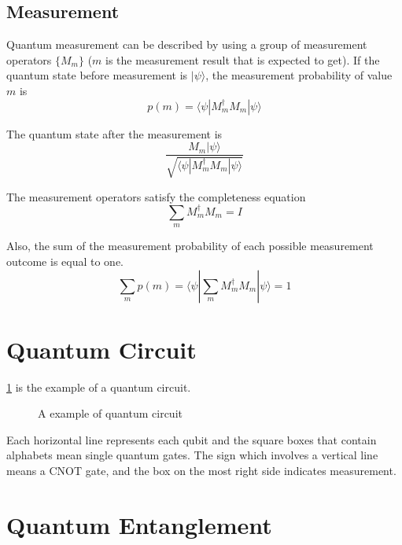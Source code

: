\subsection{Measurement}
Quantum measurement can be described by using a group of measurement operators $\{M_m\}$
($m$ is the measurement result that is expected to get).
 If the quantum state before measurement is $|\psi\rangle$, the measurement probability of value $m$ is 
 $$p(m) = \langle \psi|M^{\dagger}_m M_m|\psi\rangle$$

 The quantum state after the measurement is 
 $$\frac{M_m|\psi\rangle}{\sqrt{\langle \psi|M^{\dagger}_m M_m|\psi\rangle}}$$

The measurement operators satisfy the completeness equation
$$\sum_{m} M^{\dagger}_m M_m = I$$

Also, the sum of the measurement probability of each possible measurement outcome is equal to one.
$$\sum_{m} p(m) = \langle \psi|\sum_{m} M^{\dagger}_m M_m|\psi\rangle = 1$$


\section{Quantum Circuit}
\ref{background:example-circuit} is the example of a quantum circuit.

\begin{figure}[ht]
  \begin{center}
\caption{A example of quantum circuit}
\end{center}
\label{background:example-circuit}
\end{figure}

Each horizontal line represents each qubit and the square boxes that contain alphabets mean single quantum gates.  The sign which involves a vertical line means a CNOT gate, and the box on the most right side indicates measurement. 

\section{Quantum Entanglement}

